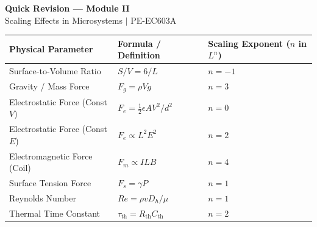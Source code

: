 \documentclass[12pt,a4paper]{article}
\renewcommand{\arraystretch}{1.45}
\begin{document}
\newpage
\begin{center}
  {\large\bfseries\color{myred} Quick Revision --- Module II}\\[3pt]
  {\small\color{mydark} Scaling Effects in Microsystems $|$ PE-EC603A}
\end{center}
\noindent{\color{myred}\rule{\linewidth}{1.2pt}}
\vspace{4pt}

\begin{tcolorbox}[formulabox, title={\textbf{Summary of Scaling Laws}}]
\renewcommand{\arraystretch}{1.3}
\begin{tabularx}{\linewidth}{B{3.8cm} Y Y}
\textbf{Physical Parameter} & \textbf{Formula / Definition} & \textbf{Scaling Exponent ($n$ in $L^n$)} \\
\hline
Surface-to-Volume Ratio & $S/V = 6/L$ & $n = -1$ \\
Gravity / Mass Force & $F_g = \rho V g$ & $n = 3$ \\
Electrostatic Force (Const $V$) & $F_e = \frac{1}{2} \epsilon A V^2 / d^2$ & $n = 0$ \\
Electrostatic Force (Const $E$) & $F_e \propto L^2 E^2$ & $n = 2$ \\
Electromagnetic Force (Coil) & $F_m \propto I L B$ & $n = 4$ \\
Surface Tension Force & $F_s = \gamma P$ & $n = 1$ \\
Reynolds Number & $Re = \rho v D_h / \mu$ & $n = 1$ \\
Thermal Time Constant & $\tau_{\text{th}} = R_{\text{th}} C_{\text{th}}$ & $n = 2$ \\
\end{tabularx}
\end{tcolorbox}
\end{document}
